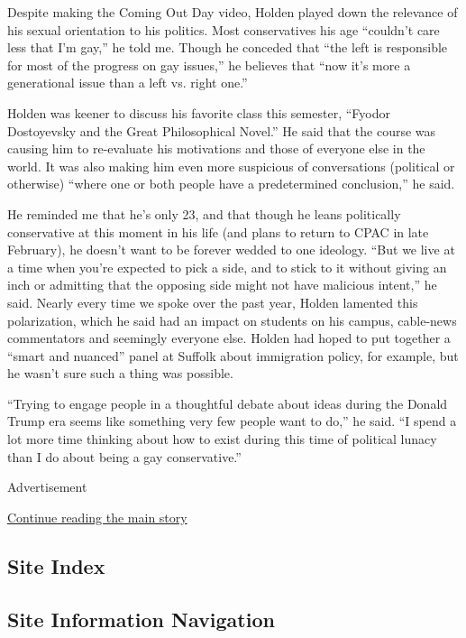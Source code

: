 Despite making the Coming Out Day video, Holden played down the
relevance of his sexual orientation to his politics. Most conservatives
his age ``couldn't care less that I'm gay,'' he told me. Though he
conceded that ``the left is responsible for most of the progress on gay
issues,'' he believes that ``now it's more a generational issue than a
left vs. right one.''

Holden was keener to discuss his favorite class this semester, ``Fyodor
Dostoyevsky and the Great Philosophical Novel.'' He said that the course
was causing him to re-evaluate his motivations and those of everyone
else in the world. It was also making him even more suspicious of
conversations (political or otherwise) ``where one or both people have a
predetermined conclusion,'' he said.

He reminded me that he's only 23, and that though he leans politically
conservative at this moment in his life (and plans to return to CPAC in
late February), he doesn't want to be forever wedded to one ideology.
``But we live at a time when you're expected to pick a side, and to
stick to it without giving an inch or admitting that the opposing side
might not have malicious intent,'' he said. Nearly every time we spoke
over the past year, Holden lamented this polarization, which he said had
an impact on students on his campus, cable-news commentators and
seemingly everyone else. Holden had hoped to put together a ``smart and
nuanced'' panel at Suffolk about immigration policy, for example, but he
wasn't sure such a thing was possible.

``Trying to engage people in a thoughtful debate about ideas during the
Donald Trump era seems like something very few people want to do,'' he
said. ``I spend a lot more time thinking about how to exist during this
time of political lunacy than I do about being a gay conservative.''

Advertisement

\protect\hyperlink{after-bottom}{Continue reading the main story}

\hypertarget{site-index}{%
\subsection{Site Index}\label{site-index}}

\hypertarget{site-information-navigation}{%
\subsection{Site Information
Navigation}\label{site-information-navigation}}

